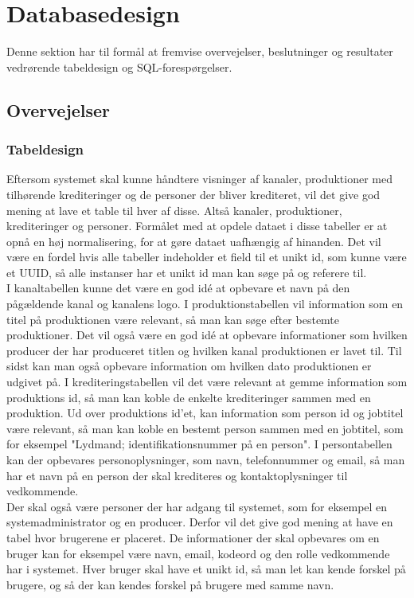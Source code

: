 \section{Databasedesign}
Denne sektion har til formål at fremvise overvejelser, beslutninger og resultater vedrørende tabeldesign og SQL-forespørgelser.

\subsection{Overvejelser}
\subsubsection{Tabeldesign}
Eftersom systemet skal kunne håndtere visninger af kanaler, produktioner med tilhørende krediteringer og de personer der bliver krediteret, vil det give god mening at lave et table til hver af disse. Altså kanaler, produktioner, krediteringer og personer. Formålet med at opdele dataet i disse tabeller er at opnå en høj normalisering, for at gøre dataet uafhængig af hinanden. Det vil være en fordel hvis alle tabeller indeholder et field til et unikt id, som kunne være et UUID, så alle instanser har et unikt id man kan søge på og referere til. \\


I kanaltabellen kunne det være en god idé at opbevare et navn på den pågældende kanal og kanalens logo. I produktionstabellen vil information som en titel på produktionen være relevant, så man kan søge efter bestemte produktioner. Det vil også være en god idé at opbevare informationer som hvilken producer der har produceret titlen og hvilken kanal produktionen er lavet til. Til sidst kan man også opbevare information om hvilken dato produktionen er udgivet på. I krediteringstabellen vil det være relevant at gemme information som produktions id, så man kan koble de enkelte krediteringer sammen med en produktion. Ud over produktions id'et, kan information som person id og jobtitel være relevant, så man kan koble en bestemt person sammen med en jobtitel, som for eksempel "Lydmand; identifikationsnummer på en person". I persontabellen kan der opbevares personoplysninger, som navn, telefonnummer og email, så man har et navn på en person der skal krediteres og kontaktoplysninger til vedkommende. \\


Der skal også være personer der har adgang til systemet, som for eksempel en systemadministrator og en producer. Derfor vil det give god mening at have en tabel hvor brugerene er placeret. De informationer der skal opbevares om en bruger kan for eksempel være navn, email, kodeord og den rolle vedkommende har i systemet. Hver bruger skal have et unikt id, så man let kan kende forskel på brugere, og så der kan kendes forskel på brugere med samme navn.

